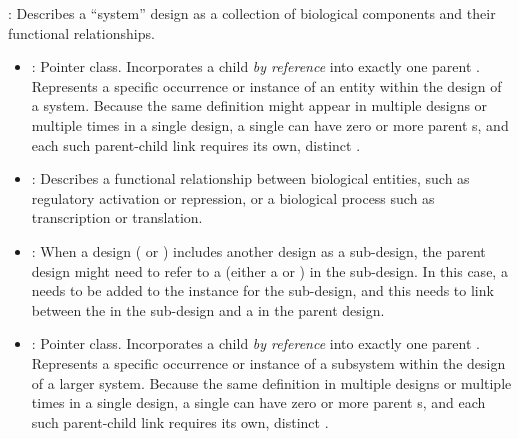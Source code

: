 \begin{description}

\item \emph{}:
Describes a ``system'' design as a collection of biological components and their functional relationships.

\begin{itemize}
\item \emph{}:
Pointer class. Incorporates a child  \textit{by reference} into exactly one parent . Represents a specific occurrence or instance of an entity within the design of a system. Because the same definition might appear in multiple designs or multiple times in a single design, a single  can have zero or more parent s, and each such parent-child link requires its own, distinct .

\item \emph{}:
Describes a functional relationship between biological entities, such as regulatory activation or repression, or a biological process such as transcription or translation.

\item \emph{}:
When a design ( or ) includes another design as a sub-design, the parent design might need to refer to a  (either a  or ) in the sub-design.
In this case, a  needs to be added to the instance for the sub-design, and this  needs to link between the  in the sub-design and a  in the parent design.

\item \emph{}:
Pointer class. Incorporates a child  \textit{by reference} into exactly one parent . Represents a specific occurrence or instance of a subsystem within the design of a larger system. Because the same definition in multiple designs or multiple times in a single design, a single  can have zero or more parent s, and each such parent-child link requires its own, distinct .


\end{itemize}
\end{description}
